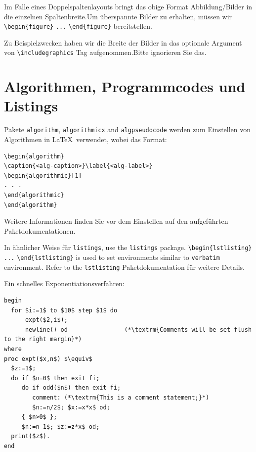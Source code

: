 \documentclass[pdflatex,sn-mathphys-num]{sn-jnl}%
\theoremstyle{thmstyleone}%
\theoremstyle{thmstyletwo}%
\theoremstyle{thmstylethree}%
\begin{document}
Im Falle eines Doppelspaltenlayouts bringt das obige Format Abbildung/Bilder in die einzelnen Spaltenbreite.Um überspannte Bilder zu erhalten, müssen wir \verb+\begin{figure}+ \verb+...+ \verb+\end{figure}+ bereitstellen.

Zu Beispielzwecken haben wir die Breite der Bilder in das optionale Argument von \verb+\includegraphics+ Tag aufgenommen.Bitte ignorieren Sie das.

\section{Algorithmen, Programmcodes und Listings} \label{sec7}

Pakete \verb+algorithm+, \verb+algorithmicx+ and \verb+algpseudocode+ werden zum Einstellen von Algorithmen in \LaTeX \ verwendet, wobei das Format:

\bigskip
\begin{verbatim}
\begin{algorithm}
\caption{<alg-caption>}\label{<alg-label>}
\begin{algorithmic}[1]
. . .
\end{algorithmic}
\end{algorithm}
\end{verbatim}
\bigskip

Weitere Informationen finden Sie vor dem Einstellen auf den aufgeführten Paketdokumentationen.

In ähnlicher Weise für \verb+listings+, use the \verb+listings+ package. \verb+\begin{lstlisting}+ \verb+...+ \verb+\end{lstlisting}+ is used to set environments similar to \verb+verbatim+ environment. Refer to the \verb+lstlisting+ Paketdokumentation für weitere Details.

Ein schnelles Exponentiationsverfahren:

\begin{lstlisting}
begin
  for $i:=1$ to $10$ step $1$ do
      expt($2,i$);  
      newline() od                (*\textrm{Comments will be set flush to the right margin}*)
where
proc expt($x,n$) $\equiv$
  $z:=1$;
  do if $n=0$ then exit fi;
     do if odd($n$) then exit fi;                 
        comment: (*\textrm{This is a comment statement;}*)
        $n:=n/2$; $x:=x*x$ od;
     { $n>0$ };
     $n:=n-1$; $z:=z*x$ od;
  print($z$). 
end
\end{lstlisting}
\end{document}
